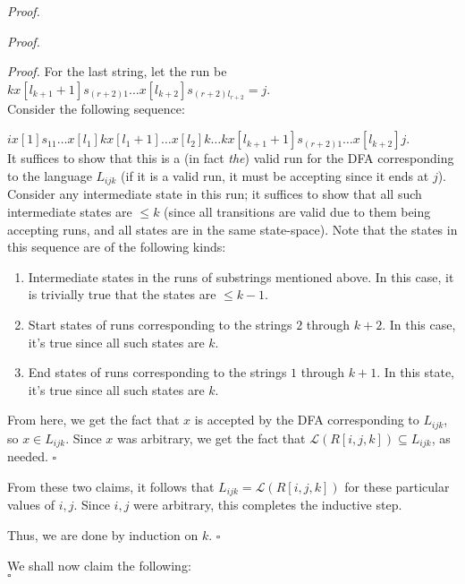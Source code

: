 \documentclass[a4paper]{article}
\newenvironment{proof}{\begin{breakbox}\textit{Proof.}}{\hfill$\square$\end{breakbox}}
\newcommand{\mc}{\mathcal}
\renewcommand{\L}{\mc{L}}
\begin{document}
\begin{proof}
\begin{proof}
\begin{enumerate}
\begin{proof}
				      For the last string, let the run be $k x[l_{k+1}+1] s_{(r+2)1} \ldots x[l_{k+2}] s_{(r+2)l_{r+2}} = j$.\\

				      Consider the following sequence:

				      $i x[1] s_{11} \ldots x[l_1] k x[l_1+1] \ldots x[l_2] k \ldots k x[l_{k+1}+1] s_{(r+2)1} \ldots x[l_{k+2}] j$.\\

				      It suffices to show that this is a (in fact \textit{the}) valid run for the DFA corresponding to the language $L_{ijk}$ (if it is a valid run, it must be accepting since it ends at $j$).\\

				      Consider any intermediate state in this run; it suffices to show that all such intermediate states are $\le k$ (since all transitions are valid due to them being
				      accepting runs, and all states are in the same state-space). Note that the states in this sequence are of the following kinds:

				      \begin{enumerate}
					      \item Intermediate states in the runs of substrings mentioned above.
					            In this case, it is trivially true that the states are $\le k - 1$.
					      \item Start states of runs corresponding to the strings $2$ through $k+2$. In this case, it's true since all such states are $k$.
					      \item End states of runs corresponding to the strings $1$ through $k+1$. In this state, it's true since all such states are $k$.
				      \end{enumerate}

				      From here, we get the fact that $x$ is accepted by the DFA corresponding to $L_{ijk}$, so $x \in L_{ijk}$. Since $x$ was arbitrary, we get the fact that $\L(R[i, j, k])
					      \subseteq L_{ijk}$, as needed.
			      \end{proof}
			      From these two claims, it follows that $L_{ijk} = \L(R[i, j, k])$ for these particular values of $i, j$. Since $i, j$ were arbitrary, this completes the inductive step.
		\end{enumerate}
		Thus, we are done by induction on $k$.
	\end{proof}

	We shall now claim the following:\\


\end{proof}
\end{document}
